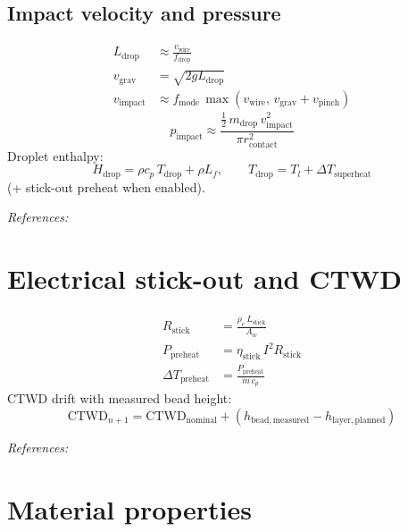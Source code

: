 \documentclass[11pt,a4paper]{article}
\newcommand{\fref}[1]{\par\smallskip\noindent\textit{References:} #1\par}
\begin{document}
\subsection{Impact velocity and pressure}
\begin{align}
  L_{\mathrm{drop}} &\approx \frac{v_{\mathrm{wire}}}{f_{\mathrm{drop}}} \\
  v_{\mathrm{grav}} &= \sqrt{2g L_{\mathrm{drop}}} \\
  v_{\mathrm{impact}} &\approx f_{\mathrm{mode}}\,
  \max\!\left(v_{\mathrm{wire}},\, v_{\mathrm{grav}} + v_{\mathrm{pinch}}\right)
\end{align}
\begin{equation}
  p_{\mathrm{impact}} \approx
  \frac{\tfrac{1}{2}\,m_{\mathrm{drop}}\,v_{\mathrm{impact}}^2}{\pi r_{\mathrm{contact}}^2}
\end{equation}
Droplet enthalpy:
\begin{equation}
  H_{\mathrm{drop}} = \rho c_p\, T_{\mathrm{drop}} + \rho L_f, \qquad
  T_{\mathrm{drop}} = T_l + \Delta T_{\mathrm{superheat}}
\end{equation}
(+ stick-out preheat when enabled).
\fref{\cite{Wang2003,Lancaster1986,Bernhardi2005,waam_twin2025}}

\section{Electrical stick-out and CTWD}

\begin{align}
  R_{\mathrm{stick}} &= \frac{\rho_e\,L_{\mathrm{stick}}}{A_w} \\
  P_{\mathrm{preheat}} &= \eta_{\mathrm{stick}}\,I^2 R_{\mathrm{stick}} \\
  \Delta T_{\mathrm{preheat}} &= \frac{P_{\mathrm{preheat}}}{\dot{m}\,c_p}
\end{align}
CTWD drift with measured bead height:
\begin{equation}
  \mathrm{CTWD}_{n+1} = \mathrm{CTWD}_{\mathrm{nominal}}
  + \left(h_{\mathrm{bead,measured}} - h_{\mathrm{layer,planned}}\right)
\end{equation}
\fref{\cite{Klaus2022,Incropera2007,BEAD2025,waam_twin2025}}

\section{Material properties}
\end{document}
